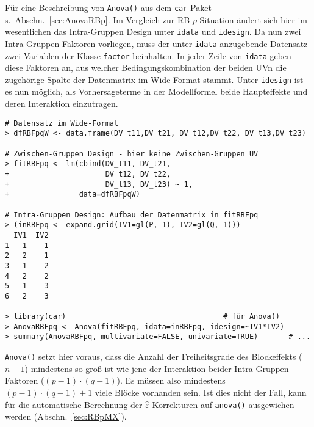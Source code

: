 Für eine Beschreibung von \lstinline!Anova()! aus dem \lstinline!car! Paket s.\ Abschn.\ \ref{sec:AnovaRBp}. Im Vergleich zur RB-$p$ Situation ändert sich hier im wesentlichen das Intra-Gruppen Design unter \lstinline!idata! und \lstinline!idesign!. Da nun zwei Intra-Gruppen Faktoren vorliegen, muss der unter \lstinline!idata! anzugebende Datensatz zwei Variablen der Klasse \lstinline!factor! beinhalten. In jeder Zeile von \lstinline!idata! geben diese Faktoren an, aus welcher Bedingungskombination der beiden UVn die zugehörige Spalte der Datenmatrix im Wide-Format stammt. Unter \lstinline!idesign! ist es nun möglich, als Vorhersageterme in der Modellformel beide Haupteffekte und deren Interaktion einzutragen.
\begin{lstlisting}
# Datensatz im Wide-Format
> dfRBFpqW <- data.frame(DV_t11,DV_t21, DV_t12,DV_t22, DV_t13,DV_t23)

# Zwischen-Gruppen Design - hier keine Zwischen-Gruppen UV
> fitRBFpq <- lm(cbind(DV_t11, DV_t21,
+                      DV_t12, DV_t22,
+                      DV_t13, DV_t23) ~ 1,
+                data=dfRBFpqW)

# Intra-Gruppen Design: Aufbau der Datenmatrix in fitRBFpq
> (inRBFpq <- expand.grid(IV1=gl(P, 1), IV2=gl(Q, 1)))
  IV1  IV2
1   1    1
2   2    1
3   1    2
4   2    2
5   1    3
6   2    3

> library(car)                                    # für Anova()
> AnovaRBFpq <- Anova(fitRBFpq, idata=inRBFpq, idesign=~IV1*IV2)
> summary(AnovaRBFpq, multivariate=FALSE, univariate=TRUE)       # ...
\end{lstlisting}

\lstinline!Anova()! setzt hier voraus, dass die Anzahl der Freiheitsgrade des Blockeffekts ($n-1$) mindestens so groß ist wie jene der Interaktion beider Intra-Gruppen Faktoren ($(p-1) \cdot (q-1)$). Es müssen also mindestens $(p-1) \cdot (q-1) + 1$ viele Blöcke vorhanden sein. Ist dies nicht der Fall, kann für die automatische Berechnung der $\hat{\varepsilon}$-Korrekturen auf \lstinline!anova()! ausgewichen werden (Abschn.\ \ref{sec:RBpMX}).

